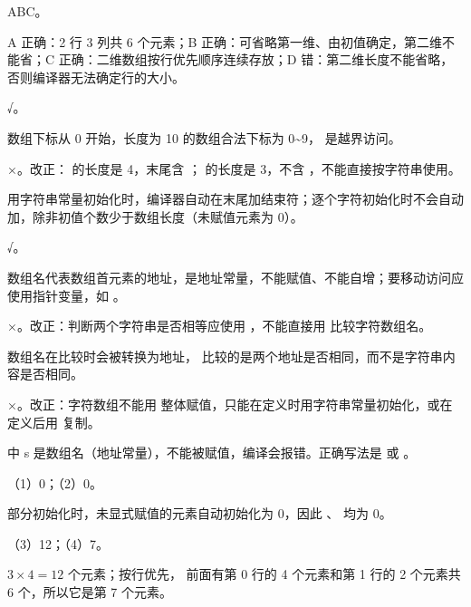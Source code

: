 \documentclass[a4paper,11pt]{article}
\begin{document}
\q ABC。\begin{analysis}A 正确：2 行 3 列共 6 个元素；B 正确：可省略第一维、由初值确定，第二维不能省；C 正确：二维数组按行优先顺序连续存放；D 错：第二维长度不能省略，否则编译器无法确定行的大小。\end{analysis}


\q √。\begin{analysis}数组下标从 0 开始，长度为 10 的数组合法下标为 0\textasciitilde 9， 是越界访问。\end{analysis}

\q ×。改正： 的长度是 4，末尾含 ； 的长度是 3，不含 ，不能直接按字符串使用。\begin{analysis}用字符串常量初始化时，编译器自动在末尾加结束符；逐个字符初始化时不会自动加，除非初值个数少于数组长度（未赋值元素为 0）。\end{analysis}

\q √。\begin{analysis}数组名代表数组首元素的地址，是地址常量，不能赋值、不能自增；要移动访问应使用指针变量，如 。\end{analysis}

\q ×。改正：判断两个字符串是否相等应使用 ，不能直接用 \code{==} 比较字符数组名。\begin{analysis}数组名在比较时会被转换为地址， 比较的是两个地址是否相同，而不是字符串内容是否相同。\end{analysis}

\q ×。改正：字符数组不能用 \code{=} 整体赋值，只能在定义时用字符串常量初始化，或在定义后用  复制。\begin{analysis} 中 s 是数组名（地址常量），不能被赋值，编译会报错。正确写法是  或 。\end{analysis}


\q （1）0；（2）0。\begin{analysis}部分初始化时，未显式赋值的元素自动初始化为 0，因此 、 均为 0。\end{analysis}

\q （3）12；（4）7。\begin{analysis}$3\times4=12$ 个元素；按行优先， 前面有第 0 行的 4 个元素和第 1 行的 2 个元素共 6 个，所以它是第 7 个元素。\end{analysis}
\end{document}
